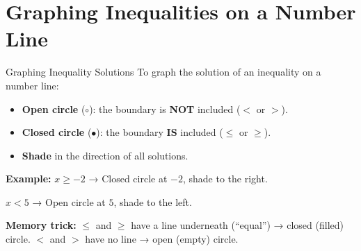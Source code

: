\section{Graphing Inequalities on a Number Line}

\begin{quickReview}{Graphing Inequality Solutions}
To graph the solution of an inequality on a number line:
\begin{itemize}[leftmargin=*]
    \item \textbf{Open circle} ($\circ$): the boundary is \textbf{NOT} included ($<$ or $>$).
    \item \textbf{Closed circle} ($\bullet$): the boundary \textbf{IS} included ($\leq$ or $\geq$).
    \item \textbf{Shade} in the direction of all solutions.
\end{itemize}

\medskip
\textbf{Example:} $x \geq -2$ → Closed circle at $-2$, shade to the right.

$x < 5$ → Open circle at $5$, shade to the left.

\smallskip
\textbf{Memory trick:} $\leq$ and $\geq$ have a line underneath (``equal'') → closed (filled) circle. $<$ and $>$ have no line → open (empty) circle.
\end{quickReview}

